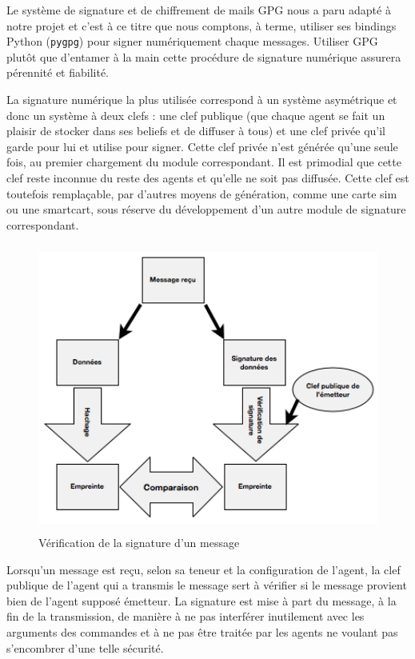\documentclass[11pt]{book}
\begin{document}
Le système de signature et de chiffrement de mails GPG nous a paru adapté 
à notre projet et c'est à ce titre que nous comptons, à terme, utiliser ses 
bindings Python (\verb?pygpg?) pour signer numériquement chaque messages. 
Utiliser GPG plutôt que d'entamer à la main cette procédure de signature 
numérique assurera pérennité et fiabilité.

La signature numérique la plus utilisée correspond à un système asymétrique 
et donc un système à deux clefs : une clef publique (que chaque agent se 
fait un plaisir de stocker dans ses beliefs et de diffuser à tous) et une 
clef privée qu'il garde pour lui et utilise pour signer. Cette clef 
privée n'est générée qu'une seule fois, au premier chargement du module 
correspondant. Il est primodial que cette clef reste inconnue du reste 
des agents et qu'elle ne soit pas diffusée. Cette clef est toutefois 
remplaçable, par d'autres moyens de génération, comme une carte sim ou une 
smartcart, sous réserve du développement d'un autre module de signature 
correspondant.

\begin{figure}[ht]
  \begin{center}
    \includegraphics[height=9.5cm]{imgs/verification.png}
    \caption{Vérification de la signature d'un message}
  \end{center}
\end{figure}

Lorsqu'un message est reçu, selon sa teneur et la configuration de l'agent, 
la clef publique de l'agent qui a transmis le message sert à vérifier si 
le message provient bien de l'agent supposé émetteur. La signature est 
mise à part du message, à la fin de la transmission, de manière à ne pas 
interférer inutilement avec les arguments des commandes et à ne pas être 
traitée par les agents ne voulant pas s'encombrer d'une telle 
sécurité.
\end{document}
